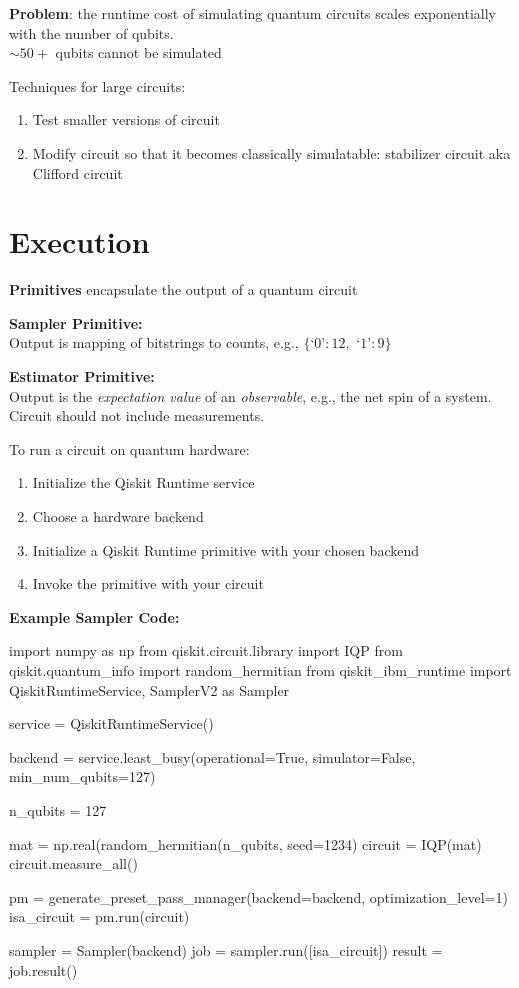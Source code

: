 \documentclass{article}
\newcommand{\ms}{\medskip}
\newlength{\tindent}
\renewcommand{\indent}{\hspace*{\tindent}}
\begin{document}
\textbf{Problem}: the runtime cost of simulating quantum circuits scales exponentially with the number of qubits.\\
\indent $\sim 50+$ qubits cannot be simulated\ms

Techniques for large circuits:
\begin{enumerate}
    \item Test smaller versions of circuit
    \item Modify circuit so that it becomes classically simulatable: stabilizer circuit aka Clifford circuit
\end{enumerate}

\section*{Execution}
\label{s:execute}

\textbf{Primitives} encapsulate the output of a quantum circuit\ms

\textbf{Sampler Primitive:}\\
Output is mapping of bitstrings to counts, e.g., $\{$`$0$'$:12,$ `$1$'$: 9\}$\ms

\textbf{Estimator Primitive:}\\
Output is the \textit{expectation value} of an \textit{observable}, e.g., the net spin of a system.\\
Circuit should not include measurements.\ms

To run a circuit on quantum hardware:
\begin{enumerate}
    \item Initialize the Qiskit Runtime service
    \item Choose a hardware backend
    \item Initialize a Qiskit Runtime primitive with your chosen backend
    \item Invoke the primitive with your circuit
\end{enumerate}\ms

\textbf{Example Sampler Code:}
\begin{python}
import numpy as np
from qiskit.circuit.library import IQP
from qiskit.quantum_info import random_hermitian
from qiskit_ibm_runtime import QiskitRuntimeService, SamplerV2 as Sampler

service = QiskitRuntimeService()

backend = service.least_busy(operational=True, simulator=False, min_num_qubits=127)

n_qubits = 127

mat = np.real(random_hermitian(n_qubits, seed=1234)
circuit = IQP(mat)
circuit.measure_all()

pm = generate_preset_pass_manager(backend=backend, optimization_level=1)
isa_circuit = pm.run(circuit)

sampler = Sampler(backend)
job = sampler.run([isa_circuit])
result = job.result()
\end{python}\ms
\end{document}
